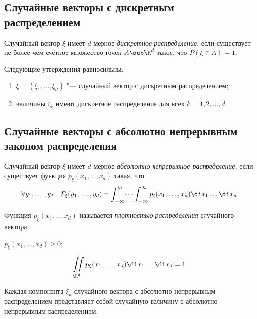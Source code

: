 \subsection{Случайные векторы с дискретным распределением}

\begin{definition}
	Случайный вектор $ \xi $ имеет $ d $-мерное \emph{дискретное распределение}, если существует не
	более чем счётное множество точек $ A \sub \R^d $ такое, что $ P(\xi \in A) = 1 $.
\end{definition}

\begin{statement}
	Следующие утверждения равносильны:
	\begin{enumerate}
		\item $ \xi = (\xi_1, \dots, \xi_d) $ "--- случайный вектор с дискретным распределением;
		\item величины $ \xi_k $ имеют дискретное распределение для всех $ k = 1, 2, \dots, d $.
	\end{enumerate}
\end{statement}

\subsection{Случайные векторы с абсолютно непрерывным законом распределения}

\begin{definition}
	Случайный вектор $ \xi $ имеет $ d $-мерное \emph{абсолютно непрерывное распределение}, если
	существует функция $ p_\xi(x_1, \dots, x_d) $ такая, что
	$$ \forall y_1, \dots, y_d \quad F_\xi(y_1, \dots, y_d) = \int_{-\infty}^{y_1} \dots
	\int_{-\infty}^{y_d} p_\xi(x_1, \dots, x_d) \di x_1 \dots \di x_d $$

	Функция $ p_\xi(x_1, \dots, x_d) $ называется \emph{плотностью распределения} случайного
	вектора.
\end{definition}

\begin{props}
\item $ p_\xi(x_1, \dots, x_d) \ge 0 $;
\item
	$$ \iint\limits_{\R^d} p_\xi(x_1, \dots, x_d) \di x_1 \dots \di x_d = 1 $$
\end{props}

\begin{statement}
	Каждая компонента $ \xi_k $ случайного вектора с абсолютно непрерывным распределением
	представляет собой случайную величину с абсолютно непрерывным распределением.
\end{statement}

